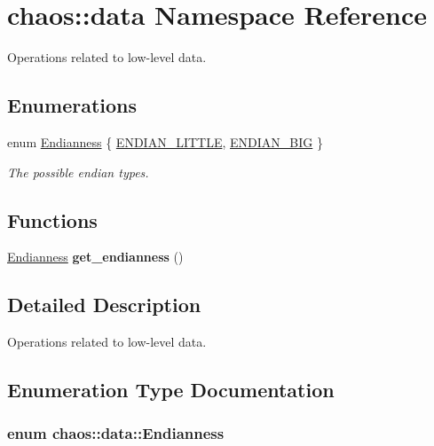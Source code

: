 \hypertarget{namespacechaos_1_1data}{\section{chaos\-:\-:data Namespace Reference}
\label{namespacechaos_1_1data}
}


Operations related to low-\/level data.  


\subsection*{Enumerations}
\begin{DoxyCompactItemize}
\item 
enum \hyperlink{namespacechaos_1_1data_adb2657d50c0b84cdc1153001031bbf3f}{Endianness} \{ \hyperlink{namespacechaos_1_1data_adb2657d50c0b84cdc1153001031bbf3fa7fc5455bb6147c278dfa4a84e255c66d}{E\-N\-D\-I\-A\-N\-\_\-\-L\-I\-T\-T\-L\-E}, 
\hyperlink{namespacechaos_1_1data_adb2657d50c0b84cdc1153001031bbf3fa0e1ed99b965cedefe24534be309738ad}{E\-N\-D\-I\-A\-N\-\_\-\-B\-I\-G}
 \}
\begin{DoxyCompactList}\small\item\em The possible endian types. \end{DoxyCompactList}\end{DoxyCompactItemize}
\subsection*{Functions}
\begin{DoxyCompactItemize}
\item 
\hypertarget{namespacechaos_1_1data_a385a3947037fe2e48044b70983ed8f80}{\hyperlink{namespacechaos_1_1data_adb2657d50c0b84cdc1153001031bbf3f}{Endianness} {\bfseries get\-\_\-endianness} ()}\label{namespacechaos_1_1data_a385a3947037fe2e48044b70983ed8f80}

\end{DoxyCompactItemize}


\subsection{Detailed Description}
Operations related to low-\/level data. 

\subsection{Enumeration Type Documentation}
\hypertarget{namespacechaos_1_1data_adb2657d50c0b84cdc1153001031bbf3f}{
\subsubsection[{Endianness}]{\setlength{\rightskip}{0pt plus 5cm}enum {\bf chaos\-::data\-::\-Endianness}}}\label{namespacechaos_1_1data_adb2657d50c0b84cdc1153001031bbf3f}


